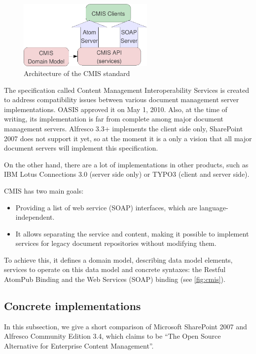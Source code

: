 \begin{figure}[H]
\centering
\includegraphics[width=250px,keepaspectratio]{cmis.pdf}
\caption{Architecture of the CMIS standard}
\label{fig:cmis}
\end{figure}

The specification called Content Management Interoperability
Services \cite{cmis} is created to address compatibility issues between various
document management server implementations. OASIS approved it on May 1, 2010.
Also, at the time of writing, its implementation is far from complete among major
document management servers. Alfresco 3.3+ implements the client side only,
SharePoint 2007 does not support it yet, so at the moment it is a only a vision that
all major document servers will implement this specification.

On the other hand, there are a lot of implementations in other products, such
as IBM Lotus Connections 3.0 \cite{lotus} (server side only) or TYPO3 (client
and server side).

CMIS has two main goals:

\begin{itemize}
\item Providing a list of web service (SOAP) interfaces, which are language-independent.
\item It allows separating the service and content, making it possible to
implement services for legacy document repositories without modifying them.
\end{itemize}

To achieve this, it defines a domain model, describing data model elements,
services to operate on this data model and concrete syntaxes: the Restful
AtomPub Binding and the Web Services (SOAP) binding (see \autoref{fig:cmis}).

\subsection{Concrete implementations}

In this subsection, we give a short comparison of Microsoft SharePoint 2007 and
Alfresco Community Edition 3.4, which claims to be ``The Open Source Alternative
for Enterprise Content Management''. \cite{alfwiki}


